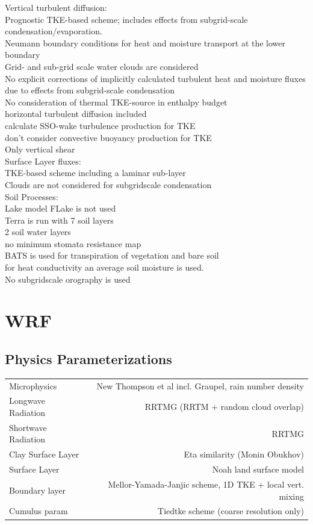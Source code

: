 Vertical turbulent diffusion:\\
Prognostic TKE-based scheme; includes effects from subgrid-scale condensation/evaporation.\\
Neumann boundary conditions for heat and moisture transport at the lower boundary\\
Grid- and sub-grid scale water clouds are considered\\
No explicit corrections of implicitly calculated turbulent heat and moisture fluxes due to effects from subgrid-scale condensation\\
No consideration of thermal TKE-source in enthalpy budget\\
horizontal turbulent diffusion included\\
calculate SSO-wake turbulence production for TKE\\
don't consider convective buoyancy production for TKE\\
Only vertical shear\\

Surface Layer fluxes:\\
TKE-based scheme including a laminar sub-layer\\
Clouds are not considered for subgridscale condensation\\

Soil Processes:\\
Lake model FLake is not used\\
Terra is run with 7 soil layers\\
2 soil water layers\\
no minimum stomata resistance map\\
BATS is used for transpiration of vegetation and bare soil\\
for heat conductivity an average soil moisture is used.\\

No subgridscale orography is used\\

\section{WRF}
\subsection{Physics Parameterizations}
\begin{tabular}{lr}
Microphysics       & New Thompson et al incl. Graupel, rain number density\\
Longwave Radiation & RRTMG (RRTM + random cloud overlap)\\
Shortwave Radiation& RRTMG\\
Clay Surface Layer & Eta similarity (Monin Obukhov)\\
Surface Layer      & Noah land surface model\\
Boundary layer     & Mellor-Yamada-Janjic scheme, 1D TKE + local vert. mixing\\
Cumulus param      & Tiedtke scheme (coarse resolution only)\\
\end{tabular}
